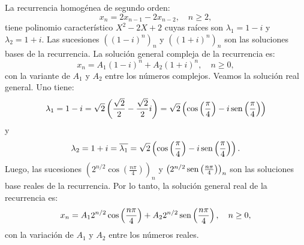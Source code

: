 \begin{example}{}
	La recurrencia homogénea de segundo orden: \[ x_{n}=2x_{n-1}-2x_{n-2},\quad n\geq2, \] tiene polinomio característico $X^{2}-2X+2$ cuyas raíces son $\lambda_{1}=1-i$ y $\lambda_{2}=1+i$. Las sucesiones ${\left((1-i)^{n}\right)}_{n}$ y ${\left((1+i)^{n}\right)}_{n} $ son las soluciones bases de la recurrencia. La solución general compleja de la recurrencia es: \[ x_{n}=A_{1}{\left(1-i\right)}^{n}+A_{2}{\left(1+i\right)}^{n},\quad n\geq 0, \] con la variante de $A_{1}$ y $A_{2}$ entre los números complejos. Veamos la solución real general. Uno tiene: \[ \lambda_{1}=1-i=\sqrt{2}\left(\frac{\sqrt{2}}{2}-\frac{\sqrt{2}}{2}i\right)=\sqrt{2}\left(\cos\left(\frac{\pi}{4}\right)-i\operatorname{sen}\left(\frac{\pi}{4}\right)\right) \] y \[ \lambda_{2}=1+i=\overline{\lambda_{1}}=\sqrt{2}\left(\cos\left(\frac{\pi}{4}\right)-i\operatorname{sen}\left(\frac{\pi}{4}\right)\right). \] Luego, las sucesiones ${\left(2^{n/2}\cos\left( \frac{n\pi}{4}\right)\right)}_{n}$ y ${\left(2^{n/2}\operatorname{sen}\left(\frac{n\pi}{4}\right)\right)}_{n}$ son las soluciones base reales de la recurrencia. Por lo tanto, la solución general real de la recurrencia es: \[ x_{n}=A_{1}2^{n/2}\cos\left(\frac{n\pi}{4}\right)+A_{2}2^{n/2}\operatorname{sen}\left(\frac{n\pi}{4}\right),\quad n\geq 0, \] con la variación de $A_{1}$ y $A_{2}$ entre los números reales.
\end{example}